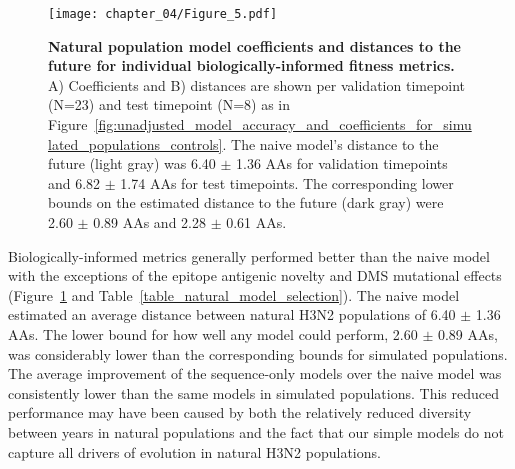 \begin{figure}
  \texttt{[image: chapter\_04/Figure\_5.pdf]}
  \caption[{Natural population model coefficients and distances to the future for individual biologically-informed fitness metrics.}]{
    {\bf Natural population model coefficients and distances to the future for individual biologically-informed fitness metrics.}
    A) Coefficients and B) distances are shown per validation timepoint (N=23) and test timepoint (N=8) as in Figure~\ref{fig:unadjusted_model_accuracy_and_coefficients_for_simulated_populations_controls}.
    The naive model's distance to the future (light gray) was 6.40 $\pm$ 1.36 AAs for validation timepoints and 6.82 $\pm$ 1.74 AAs for test timepoints.
    The corresponding lower bounds on the estimated distance to the future (dark gray) were 2.60 $\pm$ 0.89 AAs and 2.28 $\pm$ 0.61 AAs.
  }
  \label{fig:unadjusted_model_accuracy_and_coefficients_for_natural_populations}
\end{figure}

Biologically-informed metrics generally performed better than the naive model with the exceptions of the epitope antigenic novelty and DMS mutational effects (Figure~\ref{fig:unadjusted_model_accuracy_and_coefficients_for_natural_populations} and Table~\ref{table_natural_model_selection}).
The naive model estimated an average distance between natural H3N2 populations of 6.40 $\pm$ 1.36 AAs.
The lower bound for how well any model could perform, 2.60 $\pm$ 0.89 AAs, was considerably lower than the corresponding bounds for simulated populations.
The average improvement of the sequence-only models over the naive model was consistently lower than the same models in simulated populations.
This reduced performance may have been caused by both the relatively reduced diversity between years in natural populations and the fact that our simple models do not capture all drivers of evolution in natural H3N2 populations.

